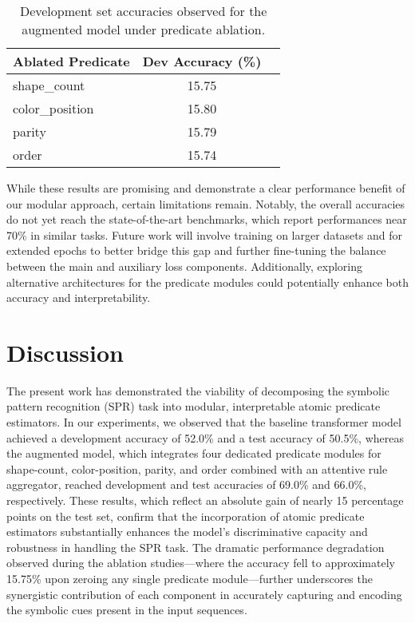 \documentclass{article}
\begin{document}
\begin{table}[h]
\centering
\begin{tabular}{lcc}
\hline
Ablated Predicate & Dev Accuracy (\%) \\\hline
shape\_count    & 15.75 \\
color\_position & 15.80 \\
parity          & 15.79 \\
order           & 15.74 \\\hline
\end{tabular}
\caption{Development set accuracies observed for the augmented model under predicate ablation.}
\label{tab:ablation_results}
\end{table}

While these results are promising and demonstrate a clear performance benefit of our modular approach, certain limitations remain. Notably, the overall accuracies do not yet reach the state-of-the-art benchmarks, which report performances near 70\% in similar tasks. Future work will involve training on larger datasets and for extended epochs to better bridge this gap and further fine-tuning the balance between the main and auxiliary loss components. Additionally, exploring alternative architectures for the predicate modules could potentially enhance both accuracy and interpretability.

\section{Discussion}
The present work has demonstrated the viability of decomposing the symbolic pattern recognition (SPR) task into modular, interpretable atomic predicate estimators. In our experiments, we observed that the baseline transformer model achieved a development accuracy of 52.0\% and a test accuracy of 50.5\%, whereas the augmented model, which integrates four dedicated predicate modules for shape-count, color-position, parity, and order combined with an attentive rule aggregator, reached development and test accuracies of 69.0\% and 66.0\%, respectively. These results, which reflect an absolute gain of nearly 15 percentage points on the test set, confirm that the incorporation of atomic predicate estimators substantially enhances the model's discriminative capacity and robustness in handling the SPR task. The dramatic performance degradation observed during the ablation studies—where the accuracy fell to approximately 15.75\% upon zeroing any single predicate module—further underscores the synergistic contribution of each component in accurately capturing and encoding the symbolic cues present in the input sequences.
\end{document}
